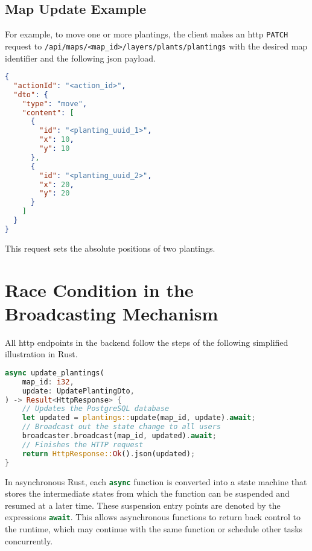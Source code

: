 \documentclass[final,oneside]{vutinfth}
\newcommand{\rustsnippet}[1]{\lstinline[language=rust]{#1}}
\newcommand{\urlsnippet}[1]{\lstinline[language=url]{#1}}
\begin{document}
\subsection{Map Update Example}

For example, to move one or more plantings, the client makes an \gls{http} \texttt{PATCH} request to \urlsnippet{/api/maps/<map_id>/layers/plants/plantings} with the desired map identifier and the following \gls{json} payload.

\begin{minipage}{\linewidth}
\begin{lstlisting}[language=json]
{
  "actionId": "<action_id>",
  "dto": {
    "type": "move",
    "content": [
      {
        "id": "<planting_uuid_1>",
        "x": 10,
        "y": 10
      },
      {
        "id": "<planting_uuid_2>",
        "x": 20,
        "y": 20
      }
    ]
  }
}
\end{lstlisting}
\end{minipage}

This request sets the absolute positions of two plantings.

\section{Race Condition in the Broadcasting Mechanism}

All \gls{http} endpoints in the backend follow the steps of the following simplified illustration in Rust.

\begin{minipage}{\linewidth}
\begin{lstlisting}[language=rust]
async update_plantings(
    map_id: i32,
    update: UpdatePlantingDto,
) -> Result<HttpResponse> {
    // Updates the PostgreSQL database
    let updated = plantings::update(map_id, update).await;
    // Broadcast out the state change to all users
    broadcaster.broadcast(map_id, updated).await;
    // Finishes the HTTP request
    return HttpResponse::Ok().json(updated);
}
\end{lstlisting}
\end{minipage}

In asynchronous Rust, each \rustsnippet{async} function is converted into a state machine that stores the intermediate states from which the function can be suspended and resumed at a later time. 
These suspension entry points are denoted by the expressions \rustsnippet{await}.
This allows asynchronous functions to return back control to the runtime, which may continue with the same function or schedule other tasks concurrently\cite{rustasyncdeepdive2024}.
\end{document}
